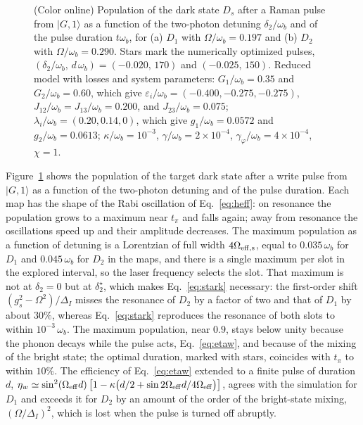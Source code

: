 \documentclass[aps,pra,preprint,groupedaddress,amsmath,amssymb,floatfix]{revtex4-2}
\newcommand{\ket}[1]{\lvert #1\rangle}
\begin{document}
\begin{figure}[t]
\centering
\resizebox{\columnwidth}{!}{}
\caption{(Color online) Population of the dark state $D_s$ after a Raman pulse from $\ket{G,1}$ as a function of the two-photon detuning $\delta_2/\omega_b$ and of the pulse duration $t\omega_b$, for (a) $D_1$ with $\Omega/\omega_b=0.197$ and (b) $D_2$ with $\Omega/\omega_b=0.290$. Stars mark the numerically optimized pulses, $(\delta_2/\omega_b,\,d\,\omega_b)=(-0.020,\,170)$ and $(-0.025,\,150)$. Reduced model with losses and system parameters: $G_1/\omega_b=0.35$ and $G_2/\omega_b=0.60$, which give $\varepsilon_i/\omega_b=(-0.400,-0.275,-0.275)$, $J_{12}/\omega_b=J_{13}/\omega_b=0.200$, and $J_{23}/\omega_b=0.075$; $\lambda_i/\omega_b=(0.20,0.14,0)$, which give $g_1/\omega_b=0.0572$ and $g_2/\omega_b=0.0613$; $\kappa/\omega_b=10^{-3}$, $\gamma/\omega_b=2\times10^{-4}$, $\gamma_\varphi/\omega_b=4\times10^{-4}$, $\chi=1$.}
\label{fig:raman_map}
\end{figure}

Figure~\ref{fig:raman_map} shows the population of the target dark state after a write pulse from $\ket{G,1}$ as a function of the two-photon detuning and of the pulse duration. Each map has the shape of the Rabi oscillation of Eq.~\eqref{eq:heff}: on resonance the population grows to a maximum near $t_\pi$ and falls again; away from resonance the oscillations speed up and their amplitude decreases. The maximum population as a function of detuning is a Lorentzian of full width $4\Omega_{\rm eff,s}$, equal to $0.035\,\omega_b$ for $D_1$ and $0.045\,\omega_b$ for $D_2$ in the maps, and there is a single maximum per slot in the explored interval, so the laser frequency selects the slot. That maximum is not at $\delta_2=0$ but at $\delta_2^\star$, which makes Eq.~\eqref{eq:stark} necessary: the first-order shift $(g_s^2-\Omega^2)/\Delta_I$ misses the resonance of $D_2$ by a factor of two and that of $D_1$ by about $30\%$, whereas Eq.~\eqref{eq:stark} reproduces the resonance of both slots to within $10^{-3}\,\omega_b$. The maximum population, near $0.9$, stays below unity because the phonon decays while the pulse acts, Eq.~\eqref{eq:etaw}, and because of the mixing of the bright state; the optimal duration, marked with stars, coincides with $t_\pi$ to within $10\%$. The efficiency of Eq.~\eqref{eq:etaw} extended to a finite pulse of duration $d$, $\eta_w\simeq\sin^2(\Omega_{\rm eff}d)\,\bigl[1-\kappa\bigl(d/2+\sin 2\Omega_{\rm eff}d/4\Omega_{\rm eff}\bigr)\bigr]$, agrees with the simulation for $D_1$ and exceeds it for $D_2$ by an amount of the order of the bright-state mixing, $(\Omega/\Delta_I)^2$, which is lost when the pulse is turned off abruptly.
\end{document}
